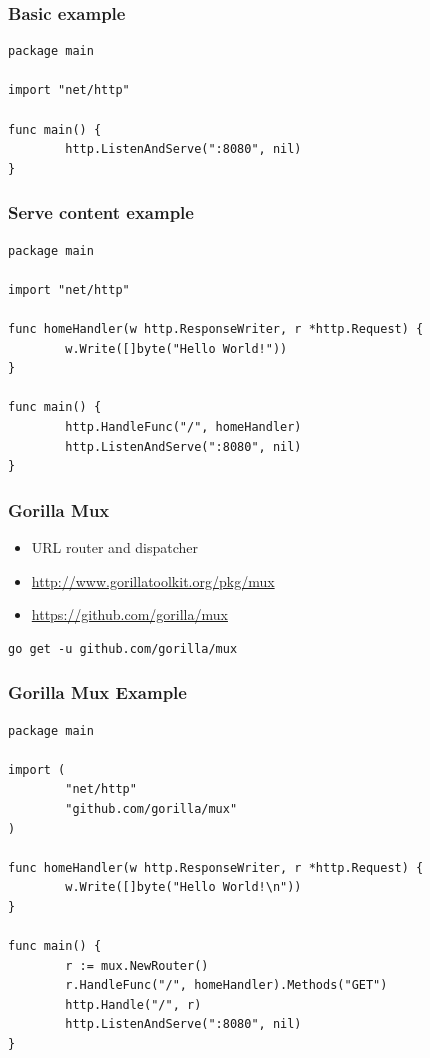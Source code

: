 \documentclass[aspectratio=169]{beamer}
\begin{document}
\begin{frame}[fragile]
  \frametitle{Basic example}

\begin{Verbatim}[fontsize=\tiny]
package main

import "net/http"

func main() {
        http.ListenAndServe(":8080", nil)
}
\end{Verbatim}

\end{frame}

\begin{frame}[fragile]
  \frametitle{Serve content example}

\begin{Verbatim}[fontsize=\tiny]
package main

import "net/http"

func homeHandler(w http.ResponseWriter, r *http.Request) {
        w.Write([]byte("Hello World!"))
}

func main() {
        http.HandleFunc("/", homeHandler)
        http.ListenAndServe(":8080", nil)
}
\end{Verbatim}

\end{frame}


\begin{frame}[fragile]
  \frametitle{Gorilla Mux}

  \begin{itemize}
  \item URL router and dispatcher
  \item \url{http://www.gorillatoolkit.org/pkg/mux}
  \item \url{https://github.com/gorilla/mux}
  \end{itemize}

\begin{Verbatim}[fontsize=\tiny]
go get -u github.com/gorilla/mux
\end{Verbatim}
  
\end{frame}


\begin{frame}[fragile]
  \frametitle{Gorilla Mux Example}

\begin{Verbatim}[fontsize=\tiny]
package main

import (
        "net/http"
        "github.com/gorilla/mux"
)

func homeHandler(w http.ResponseWriter, r *http.Request) {
        w.Write([]byte("Hello World!\n"))
}

func main() {
        r := mux.NewRouter()
        r.HandleFunc("/", homeHandler).Methods("GET")
        http.Handle("/", r)
        http.ListenAndServe(":8080", nil)
}
\end{Verbatim}
  
\end{frame}
\end{document}
